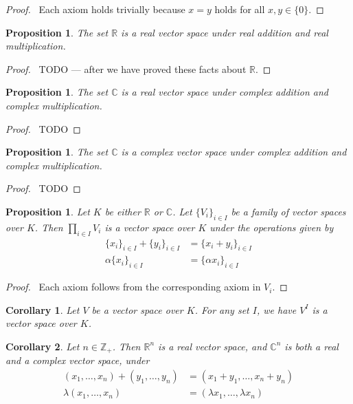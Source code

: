 \documentclass{book}
\let\qed\relax
\newtheorem{prop}[ax]{Proposition}
\newtheorem{cor}{Corollary}[ax]
\theoremstyle{definition}
\begin{document}
\begin{proof}
\pf\ Each axiom holds trivially because $x=y$ holds for all $x,y \in \{0\}$. \qed
\end{proof}

\begin{prop}
The set $\mathbb{R}$ is a real vector space under real addition and real multiplication.
\end{prop}

\begin{proof}
\pf\ TODO --- after we have proved these facts about $\mathbb{R}$. \qed
\end{proof}

\begin{prop}
The set $\mathbb{C}$ is a real vector space under complex addition and complex multiplication.
\end{prop}

\begin{proof}
\pf\ TODO
\end{proof}

\begin{prop}
The set $\mathbb{C}$ is a complex vector space under complex addition and complex multiplication.
\end{prop}

\begin{proof}
\pf\ TODO
\end{proof}

\begin{prop}
Let $K$ be either $\mathbb{R}$ or $\mathbb{C}$.
Let $\{ V_i \}_{i \in I}$ be a family of vector spaces over $K$. Then $\prod_{i \in I} V_i$ is a vector space over $K$ under the operations given by
\begin{align*}
\{x_i\}_{i \in I} + \{y_i\}_{i \in I} & = \{ x_i + y_i \}_{i \in I} \\
\alpha \{x_i\}_{i \in I} & = \{ \alpha x_i \}_{i \in I}
\end{align*}
\end{prop}

\begin{proof}
\pf\ Each axiom follows from the corresponding axiom in $V_i$. \qed
\qed
\end{proof}

\begin{cor}
Let $V$ be a vector space over $K$. For any set $I$, we have $V^I$ is a vector space over $K$.
\end{cor}

\begin{cor}
Let $n \in \mathbb{Z}_+$. Then $\mathbb{R}^n$ is a real vector space, and $\mathbb{C}^n$ is both a real and a complex vector space, under
\begin{align*}
(x_1, \ldots, x_n) + (y_1, \ldots, y_n) & = (x_1 + y_1, \ldots, x_n + y_n) \\
\lambda (x_1, \ldots, x_n) & = (\lambda x_1, \ldots, \lambda x_n)
\end{align*}
\end{cor}
\end{document}
